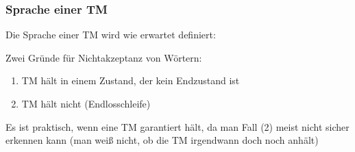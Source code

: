 \documentclass[aspectratio=1610,onlymath]{beamer}
\begin{document}
\begin{frame}\frametitle{Sprache einer TM}

Die Sprache einer TM wird wie erwartet definiert:

\pause

Zwei Gründe für Nichtakzeptanz von Wörtern:
\begin{enumerate}[(1)]
\item TM hält in einem Zustand, der kein Endzustand ist
\item TM hält nicht (Endlosschleife)
\end{enumerate}
Es ist praktisch, wenn eine TM garantiert hält, da man Fall (2) meist nicht sicher erkennen kann (man weiß nicht, ob die TM irgendwann doch noch anhält)


\end{frame}
\end{document}
